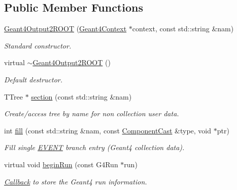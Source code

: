 \subsection*{Public Member Functions}
\begin{DoxyCompactItemize}
\item 
\hyperlink{class_d_d4hep_1_1_simulation_1_1_geant4_output2_r_o_o_t_ab53b90ff941ab7e6fde9e410c346b2a1}{Geant4Output2ROOT} (\hyperlink{class_d_d4hep_1_1_simulation_1_1_geant4_context}{Geant4Context} $\ast$context, const std::string \&nam)
\begin{DoxyCompactList}\small\item\em Standard constructor. \item\end{DoxyCompactList}\item 
virtual \hyperlink{class_d_d4hep_1_1_simulation_1_1_geant4_output2_r_o_o_t_a572289de75b5e3a65cb3bda92139cba2}{$\sim$Geant4Output2ROOT} ()
\begin{DoxyCompactList}\small\item\em Default destructor. \item\end{DoxyCompactList}\item 
TTree $\ast$ \hyperlink{class_d_d4hep_1_1_simulation_1_1_geant4_output2_r_o_o_t_a977fb2f2bed7eb8e80ec52e91bc4ac4d}{section} (const std::string \&nam)
\begin{DoxyCompactList}\small\item\em Create/access tree by name for non collection user data. \item\end{DoxyCompactList}\item 
int \hyperlink{class_d_d4hep_1_1_simulation_1_1_geant4_output2_r_o_o_t_a2814387feba0de7236578876ad2f1981}{fill} (const std::string \&nam, const \hyperlink{class_d_d4hep_1_1_component_cast}{ComponentCast} \&type, void $\ast$ptr)
\begin{DoxyCompactList}\small\item\em Fill single \hyperlink{namespace_e_v_e_n_t}{EVENT} branch entry (Geant4 collection data). \item\end{DoxyCompactList}\item 
virtual void \hyperlink{class_d_d4hep_1_1_simulation_1_1_geant4_output2_r_o_o_t_a03f3906460b18ff0b31b9c0f9060d93d}{beginRun} (const G4Run $\ast$run)
\begin{DoxyCompactList}\small\item\em \hyperlink{class_d_d4hep_1_1_callback}{Callback} to store the Geant4 run information. \item\end{DoxyCompactList}\item 

\end{DoxyCompactItemize}
